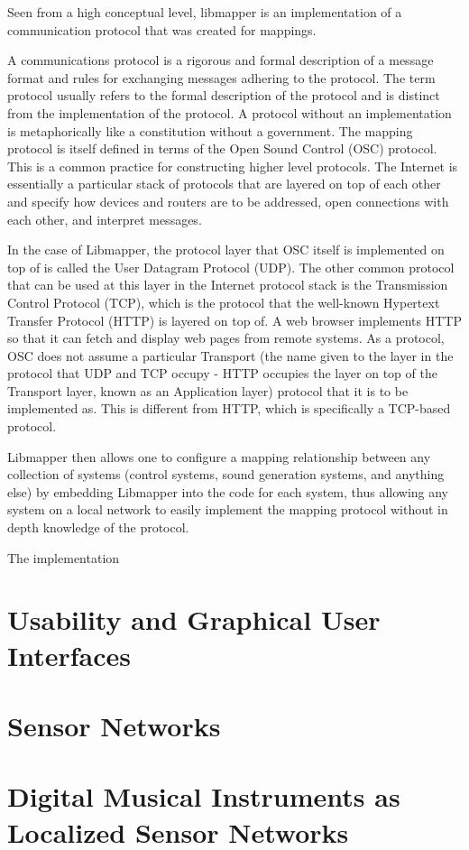 Seen from a high conceptual level, libmapper is an implementation of a communication protocol that was created for mappings. 

A communications protocol is a rigorous and formal description of a message format and rules for exchanging messages adhering to the protocol. The term protocol usually refers to the formal description of the protocol and is distinct from the implementation of the protocol. A protocol without an implementation is metaphorically like a constitution without a government. The mapping protocol is itself defined in terms of the Open Sound Control (OSC) protocol. This is a common practice for constructing higher level protocols. The Internet is essentially a particular stack of protocols that are layered on top of each other and specify how devices and routers are to be addressed, open connections with each other, and interpret messages.

In the case of Libmapper, the protocol layer that OSC itself is implemented on top of is called the User Datagram Protocol (UDP). The other common protocol that can be used at this layer in the Internet protocol stack is the Transmission Control Protocol (TCP), which is the protocol that the well-known Hypertext Transfer Protocol (HTTP) is layered on top of. A web browser implements HTTP so that it can fetch and display web pages from remote systems. As a protocol, OSC does not assume a particular Transport (the name given to the layer in the protocol that UDP and TCP occupy - HTTP occupies the layer on top of the Transport layer, known as an Application layer) protocol that it is to be implemented as. This is different from HTTP, which is specifically a TCP-based protocol.

Libmapper then allows one to configure a mapping relationship between any collection of systems (control systems, sound generation systems, and anything else) by embedding Libmapper into the code for each system, thus allowing any system on a local network to easily implement the mapping protocol without in depth knowledge of the protocol.

The implementation

\section{Usability and Graphical User Interfaces}

\section{Sensor Networks}

\section{Digital Musical Instruments as Localized Sensor Networks}
